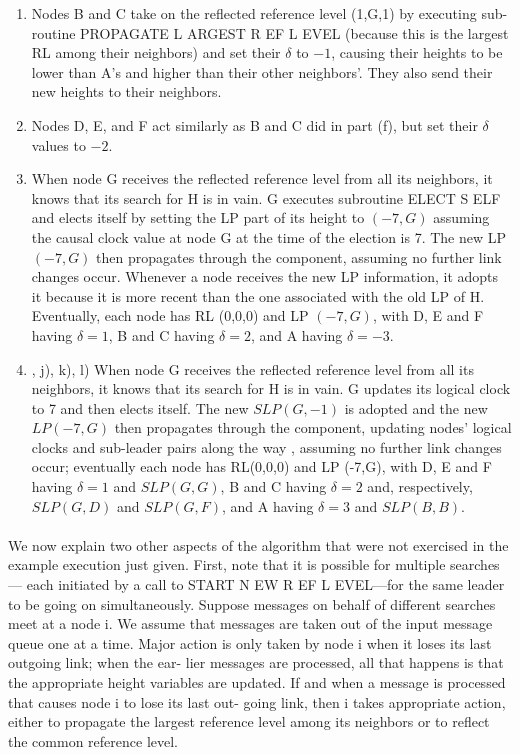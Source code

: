 \begin{enumerate}[label=\alph*)]
	\item Nodes B and C take on the reflected reference level (1,G,1) by executing sub- routine PROPAGATE L ARGEST R EF L EVEL (because this is the largest RL among their neighbors) and set their $\delta$ to $-1$, causing their heights to be lower than A’s and higher than their other neighbors’. They also send their new heights to their neighbors.
	\item Nodes D, E, and F act similarly as B and C did in part (f), but set their $\delta$ values to $-2$.
	\item When node G receives the reflected reference level from all its neighbors, it knows that its search for H is in vain. G executes subroutine ELECT S ELF and elects itself by setting the LP part of its height to $(-7,G)$ assuming the causal clock value at node G at the time of the election is 7. The new LP $(-7,G)$ then propagates through the component, assuming no further link changes occur. Whenever a node receives the new LP information, it adopts it because it is more recent than the one associated with the old LP of H. Eventually, each node has RL (0,0,0) and LP $(-7,G)$, with D, E and F having $\delta = 1$, B and C having $\delta = 2$, and A having $\delta = -3$.
	\item , j), k), l) When node G receives the reflected reference level from all its neighbors, it knows that its search for H is in vain. G updates its logical clock to 7 and then elects itself. The new $SLP(G,-1)$ is adopted and the new $LP(-7,G)$ then propagates through the component, updating nodes’ logical clocks and sub-leader pairs along the way , assuming no further link changes occur; eventually each node has RL(0,0,0) and LP (-7,G), with D, E and F having $\delta = 1$ and $SLP(G,G)$, B and C having $\delta = 2$ and, respectively, $SLP(G,D)$ and $SLP(G,F)$, and A having $\delta = 3$ and $SLP(B,B)$.
\end{enumerate}
\paragraph{}We now explain two other aspects of the algorithm that were not exercised in the example execution just given. First, note that it is possible for multiple searches— each initiated by a call to START N EW R EF L EVEL—for the same leader to be going on simultaneously. Suppose messages on behalf of different searches meet at a node i. We assume that messages are taken out of the input message queue one at a time. Major action is only taken by node i when it loses its last outgoing link; when the ear- lier messages are processed, all that happens is that the appropriate height variables are updated. If and when a message is processed that causes node i to lose its last out- going link, then i takes appropriate action, either to propagate the largest reference level among its neighbors or to reflect the common reference level.
